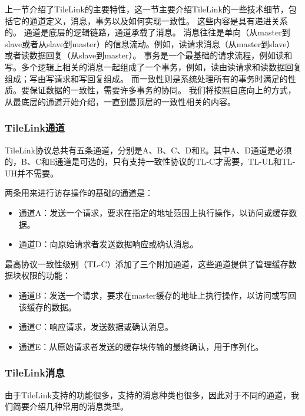 \begin{center}
上一节介绍了TileLink的主要特性，这一节主要介绍TileLink的一些技术细节，包括它的通道定义，消息，事务以及如何实现一致性。
这些内容是具有递进关系的。
通道是底层的逻辑链路，通道承载了消息。
消息往往是单向（从master到slave或者从slave到master）的信息流动。例如，读请求消息（从master到slave）或者读数据回复（从slave到master）。
事务是一个最基础的请求流程，例如读和写。多个逻辑上相关的消息一起组成了一个事务，例如，读由读请求和读数据回复组成；写由写请求和写回复组成。
而一致性则是系统处理所有的事务时满足的性质。要保证数据的一致性，需要许多事务的协同。
我们将按照自底向上的方式，从最底层的通道开始介绍，一直到最顶层的一致性相关的内容。


\subsubsection{TileLink通道}

TileLink协议总共有五条通道，分别是A、B、C、D和E。其中A、D通道是必须的，B、C和E通道是可选的，只有支持一致性协议的TL-C才需要，TL-UL和TL-UH并不需要。

两条用来进行访存操作的基础的通道是：

\begin{itemize}
	\item 通道A：发送一个请求，要求在指定的地址范围上执行操作，以访问或缓存数据。
	\item 通道D：向原始请求者发送数据响应或确认消息。
\end{itemize}

最高协议一致性级别（TL-C）添加了三个附加通道，这些通道提供了管理缓存数据块权限的功能：
\begin{itemize}
	\item 通道B：发送一个请求，要求在master缓存的地址上执行操作，以访问或写回该缓存的数据。
	\item 通道C：响应请求，发送数据或确认消息。
	\item 通道E：从原始请求者发送的缓存块传输的最终确认，用于序列化。
\end{itemize}

\subsubsection{TileLink消息}

由于TileLink支持的功能很多，支持的消息种类也很多，因此对于不同的通道，我们简要介绍几种常用的消息类型。


\end{center}
